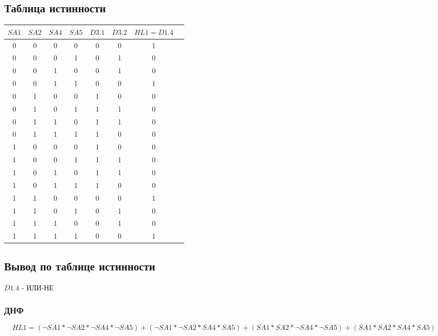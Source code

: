 \documentclass[a4paper]{article}
\begin{document}
\subsection{Таблица истинности}
\begin{table}[H]
    \centering
    \begin{tabular}{|c|c|c|c|c|c|c|c|}
        \hline
        $SA1$ & $SA2$ & $SA4$ & $SA5$ & $D3.1$ & $D3.2$ & $HL1 = D1.4$\\
        \hline
        0 & 0 & 0 & 0 & 0 & 0 & 1 \\
        0 & 0 & 0 & 1 & 0 & 1 & 0 \\
        0 & 0 & 1 & 0 & 0 & 1 & 0 \\
        0 & 0 & 1 & 1 & 0 & 0 & 1 \\
        0 & 1 & 0 & 0 & 1 & 0 & 0 \\
        0 & 1 & 0 & 1 & 1 & 1 & 0 \\
        0 & 1 & 1 & 0 & 1 & 1 & 0 \\
        0 & 1 & 1 & 1 & 1 & 0 & 0 \\
        1 & 0 & 0 & 0 & 1 & 0 & 0 \\
        1 & 0 & 0 & 1 & 1 & 1 & 0 \\
        1 & 0 & 1 & 0 & 1 & 1 & 0 \\
        1 & 0 & 1 & 1 & 1 & 0 & 0 \\
        1 & 1 & 0 & 0 & 0 & 0 & 1 \\
        1 & 1 & 0 & 1 & 0 & 1 & 0 \\
        1 & 1 & 1 & 0 & 0 & 1 & 0 \\
        1 & 1 & 1 & 1 & 0 & 0 & 1 \\
        \hline
    \end{tabular}
\end{table}
\subsection{Вывод по таблице истинности}
$D1.4$ - ИЛИ-НЕ
\subsubsection{ДНФ}
\begin{dmath}
    HL1  = (\neg SA1*\neg SA2 *\neg SA4 *\neg SA5) + (\neg SA1*\neg SA2*SA4*SA5) + (SA1*SA2*\neg SA4*\neg SA5) + ( SA1*SA2* SA4*SA5)
\end{dmath}

\pagebreak
\end{document}
